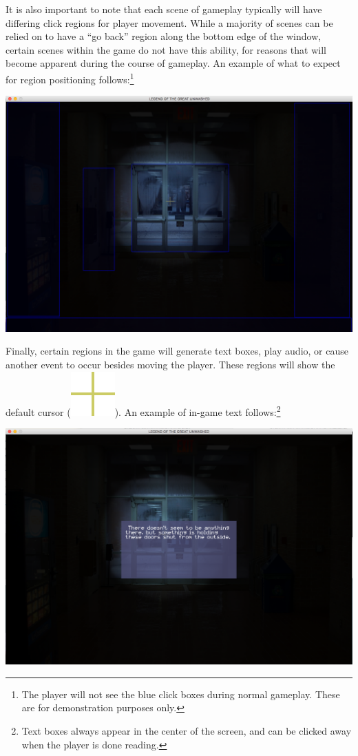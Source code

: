 \documentclass{article}
\begin{document}
		It is also important to note that each scene of gameplay typically will have differing click regions for player movement. While a majority of scenes can be relied on to have a ``go back'' region along the bottom edge of the window, certain scenes within the game do not have this ability, for reasons that will become apparent during the course of gameplay. An example of what to expect for region positioning follows:\footnote{The player will not see the blue click boxes during normal gameplay. These are for demonstration purposes only.}
		\begin{center}
			\includegraphics[scale=0.3]{UMimages/clickDemo}
		\end{center}
		Finally, certain regions in the game will generate text boxes, play audio, or cause another event to occur besides moving the player. These regions will show the default cursor (\includegraphics[scale=0.15]{UMimages/Default}). An example of in-game text follows:\footnote{Text boxes always appear in the center of the screen, and can be clicked away when the player is done reading.}
		\begin{center}
			\includegraphics[scale=0.3]{UMimages/textDemo}
		\end{center}
\end{document}
